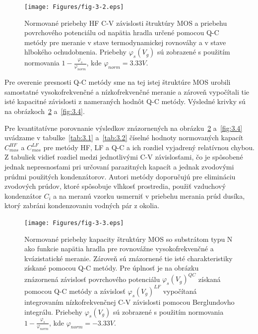 \begin{figure}[h!]\centering
  \texttt{[image: Figures/fig-3-2.eps]}
  \caption[Normované priebehy HF C-V závislosti štruktúry MOS a priebehu
  povrchového potenciálu od napätia hradla určené pomocou Q-C metódy
  pre meranie v stave termodynamickej rovnováhy a v stave hlbokého
  ochudobnenia]{Normované priebehy HF C-V závislosti štruktúry
  MOS a priebehu povrchového potenciálu od napätia hradla určené
  pomocou Q-C metódy pre meranie v stave termodynamickej rovnováhy a v
  stave hlbokého ochudobnenia. Priebehy $\varphi_s(V_g)$ sú zobrazené
  s použitím normovania $1 - \frac{\varphi_s}{\varphi_{norm}}$, kde
  $\varphi_{norm}=3.33V$.}\label{fig:3.2}
\end{figure}

Pre overenie presnosti Q-C metódy sme na tej istej štruktúre MOS
urobili samostatné vysokofrekvenčné a nízkofrekvenčné meranie a
zároveň vypočítali tie isté kapacitné závislosti z nameraných hodnôt
Q-C metódy.  Výsledné krivky sú na obrázkoch~\ref{fig:3.3} a~\ref{fig:3.4}.

Pre kvantitatívne porovnanie výsledkov znázornených na
obrázku~\ref{fig:3.3} a~\ref{fig:3.4} uvádzame v tabulke~\ref{tab:3.1}
a~\ref{tab:3.2} číselné hodnoty normovaných kapacít $C^{HF}_{mos}$ a
$C^{LF}_{mos}$ pre metódy HF, LF a Q-C a ich rozdiel vyjadrený
relatívnou chybou. Z tabuliek vidieť rozdiel medzi jednotlivými C-V
závislosťami, čo je spôsobené jednak nepresnosťami pri určovaní
parazitných kapacít a jednak zvodovými prúdmi použitých
kondenzátorov. Autori metódy doporučujú pre elimináciu zvodových
prúdov, ktoré spôsobuje vlhkosť prostredia, použiť vzduchový
kondenzátor $C_i$ a na meranú vzorku usmerniť v priebehu merania prúd
dusíka, ktorý zabráni kondenzovaniu vodných pár z okolia.

\newline
\begin{figure}[h!]\centering
  \texttt{[image: Figures/fig-3-3.eps]}
  \caption[Normované priebehy kapacity štruktúry MOS so substrátom typu
  N ako funkcie napätia hradla pre rovnovážne vysokofrekvenčné a
  kvázistatické meranie]{Normované priebehy kapacity štruktúry MOS so
  substrátom typu N ako funkcie napätia hradla pre rovnovážne
  vysokofrekvenčné a kvázistatické meranie.  Zároveň sú znázornené tie
  isté charakteristiky získané pomocou Q-C metódy. Pre úplnosť je na
  obrázku znázornená závislosť povrchového potenciálu
  ${\varphi_s(V_g)}^{QC}$ získaná pomocou Q-C metódy a závislosť
  ${\varphi_s(V_g)}^{LF}$ vypočítaná integrovaním nízkofrekvenčnej C-V
  závislosti pomocou Berglundovho integrálu.  Priebehy
  $\varphi_s(V_g)$ sú zobrazené s použitím normovania $1 -
  \frac{\varphi_s}{\varphi_{norm}}$, kde $\varphi_{norm}=-3.33V$.}\label{fig:3.3}
\end{figure}

